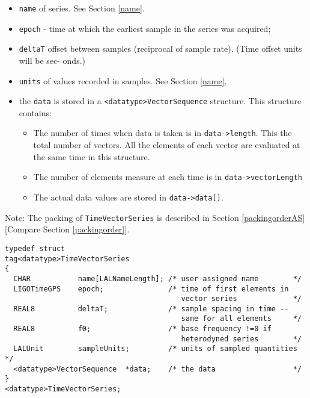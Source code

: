 \documentclass[]{ligodcc}
\begin{document}
\begin{itemize}
\vspace{-0.15in}
\item
{\tt name} of series. See Section \ref{name}.
\vspace{-0.15in}
\item
{\tt epoch} - time at which the earliest sample in the series was acquired;
\vspace{-0.15in}
\item
{\tt deltaT} offset between samples (reciprocal of sample rate).  (Time
offset units will be sec- onds.)
\vspace{-0.15in}
\item
{\tt units} of values recorded in samples. See Section \ref{name}.
\vspace{-0.15in}
\item
the {\tt data} is stored in a {\tt <datatype>VectorSequence}  structure.
This structure contains: 
\begin{itemize}
\vspace{-0.15in}
\item
The number of times when data is taken is in {\tt data->length}. This the
total number of vectors. All the elements of each vector are evaluated at the 
same time in this structure.
\item
The number of elements measure at each time is in {\tt data->vectorLength}
\item
The  actual data  values are stored in {\tt data->data[]}.
\end{itemize}
\end{itemize}

Note: The packing of {\tt TimeVectorSeries} is described in Section
\ref{packingorderAS} [Compare Section \ref{packingorder}].

{\footnotesize
\begin{verbatim}
typedef struct
tag<datatype>TimeVectorSeries
{
  CHAR           name[LALNameLength]; /* user assigned name        */
  LIGOTimeGPS    epoch;               /* time of first elements in
                                         vector series             */
  REAL8          deltaT;              /* sample spacing in time -- 
                                         same for all elements     */
  REAL8          f0;                  /* base frequency !=0 if 
                                         heterodyned series        */
  LALUnit        sampleUnits;         /* units of sampled quantities */
  <datatype>VectorSequence  *data;    /* the data                  */
}
<datatype>TimeVectorSeries;
\end{verbatim}}
\end{document}
